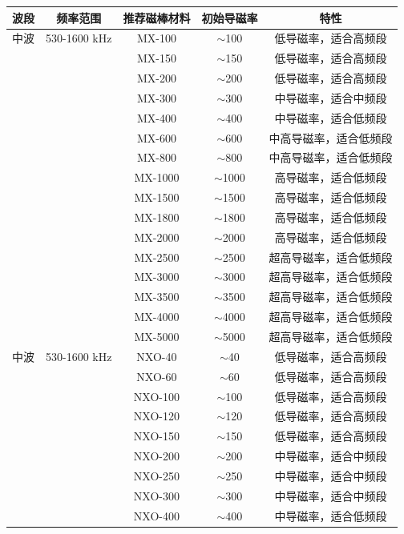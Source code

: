 \begin{center}
\begin{tabular}{|c|c|c|c|c|}
\hline
\textbf{波段} & \textbf{频率范围} & \textbf{推荐磁棒材料} & \textbf{初始导磁率} & \textbf{特性} \\
\hline
中波 & 530-1600 kHz & MX-100 & $\sim$100 & 低导磁率，适合高频段 \\
 & & MX-150 & $\sim$150 & 低导磁率，适合高频段 \\
 & & MX-200 & $\sim$200 & 低导磁率，适合高频段 \\
 & & MX-300 & $\sim$300 & 中导磁率，适合中频段 \\
 & & MX-400 & $\sim$400 & 中导磁率，适合低频段 \\
 & & MX-600 & $\sim$600 & 中高导磁率，适合低频段 \\
 & & MX-800 & $\sim$800 & 中高导磁率，适合低频段 \\
 & & MX-1000 & $\sim$1000 & 高导磁率，适合低频段 \\
 & & MX-1500 & $\sim$1500 & 高导磁率，适合低频段 \\
 & & MX-1800 & $\sim$1800 & 高导磁率，适合低频段 \\
 & & MX-2000 & $\sim$2000 & 高导磁率，适合低频段 \\
 & & MX-2500 & $\sim$2500 & 超高导磁率，适合低频段 \\
 & & MX-3000 & $\sim$3000 & 超高导磁率，适合低频段 \\
 & & MX-3500 & $\sim$3500 & 超高导磁率，适合低频段 \\
 & & MX-4000 & $\sim$4000 & 超高导磁率，适合低频段 \\
 & & MX-5000 & $\sim$5000 & 超高导磁率，适合低频段 \\
\hline
中波 & 530-1600 kHz & NXO-40 & $\sim$40 & 低导磁率，适合高频段 \\
 & & NXO-60 & $\sim$60 & 低导磁率，适合高频段 \\
 & & NXO-100 & $\sim$100 & 低导磁率，适合高频段 \\
 & & NXO-120 & $\sim$120 & 低导磁率，适合高频段 \\
 & & NXO-150 & $\sim$150 & 低导磁率，适合高频段 \\
 & & NXO-200 & $\sim$200 & 中导磁率，适合中频段 \\
 & & NXO-250 & $\sim$250 & 中导磁率，适合中频段 \\
 & & NXO-300 & $\sim$300 & 中导磁率，适合中频段 \\
 & & NXO-400 & $\sim$400 & 中导磁率，适合低频段 \\

\end{tabular}
\end{center}
